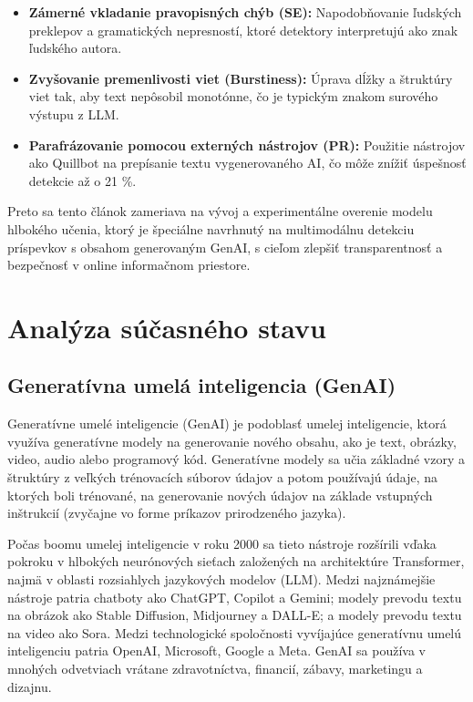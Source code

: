 \documentclass[]{tukediphc}
\begin{document}
\begin{itemize}
    \item \textbf{Zámerné vkladanie pravopisných chýb (SE):} Napodobňovanie ľudských preklepov a gramatických nepresností, ktoré detektory interpretujú ako znak ľudského autora\cite{Simple_techniques_to_bypass_GenAI_text_detectors:_implications_for_inclusive_education}.
    \item \textbf{Zvyšovanie premenlivosti viet (Burstiness):} Úprava dĺžky a štruktúry viet tak, aby text nepôsobil monotónne, čo je typickým znakom surového výstupu z LLM\cite{Simple_techniques_to_bypass_GenAI_text_detectors:_implications_for_inclusive_education}.
    \item \textbf{Parafrázovanie pomocou externých nástrojov (PR):} Použitie nástrojov ako Quillbot na prepísanie textu vygenerovaného AI, čo môže znížiť úspešnosť detekcie až o 21 \%\cite{Simple_techniques_to_bypass_GenAI_text_detectors:_implications_for_inclusive_education}.
\end{itemize}

Preto sa tento článok zameriava na vývoj a experimentálne overenie modelu hlbokého učenia, ktorý je špeciálne navrhnutý na multimodálnu detekciu príspevkov s obsahom generovaným GenAI, s cieľom zlepšiť transparentnosť a bezpečnosť v online informačnom priestore.

\section{Analýza súčasného stavu}

\subsection{Generatívna umelá inteligencia (GenAI)}
Generatívne umelé inteligencie (GenAI) je podoblasť umelej inteligencie, ktorá využíva generatívne modely na generovanie nového obsahu, ako je text, obrázky, video, audio alebo programový kód. Generatívne modely sa učia základné vzory a štruktúry z veľkých trénovacích súborov údajov a potom používajú údaje, na ktorých boli trénované, na generovanie nových údajov na základe vstupných inštrukcií (zvyčajne vo forme príkazov prirodzeného jazyka). 

Počas boomu umelej inteligencie v roku 2000 sa tieto nástroje rozšírili vďaka pokroku v hlbokých neurónových sieťach založených na architektúre Transformer, najmä v oblasti rozsiahlych jazykových modelov (LLM). Medzi najznámejšie nástroje patria chatboty ako ChatGPT, Copilot a Gemini; modely prevodu textu na obrázok ako Stable Diffusion, Midjourney a DALL-E; a modely prevodu textu na video ako Sora. Medzi technologické spoločnosti vyvíjajúce generatívnu umelú inteligenciu patria OpenAI, Microsoft, Google a Meta. GenAI sa používa v mnohých odvetviach vrátane zdravotníctva, financií, zábavy, marketingu a dizajnu\cite{wiki:genai}.
\end{document}
